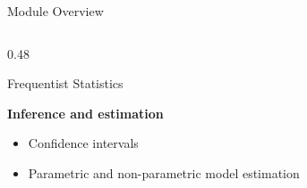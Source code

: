 \documentclass{beamer}
\begin{document}
\begin{frame}{Module Overview}
\begin{columns}[T,onlytextwidth]
\begin{column}{0.48\textwidth}
\begin{block}{Frequentist Statistics}
\vspace{2mm}

\textbf{Inference and estimation}
\begin{itemize}
    \item Confidence intervals
    \item Parametric and non-parametric
          model estimation
\end{itemize}

\end{block}

\end{column}

\end{columns}

\end{frame}

\end{document}
